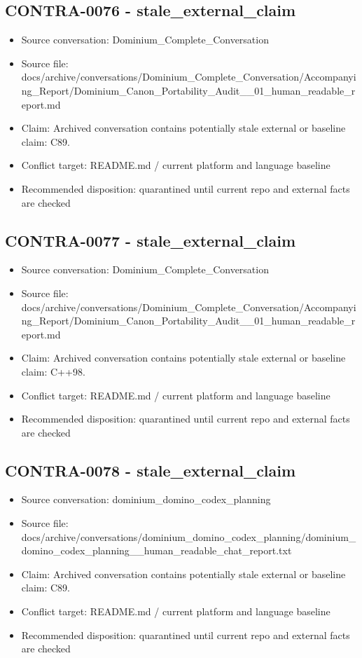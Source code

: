 \documentclass[11pt,a4paper]{report}
\begin{document}
\subsection{CONTRA-0076 - stale\_external\_claim}

\begin{itemize}
\item Source conversation: Dominium\_Complete\_Conversation
\item Source file: docs/archive/conversations/Dominium\_Complete\_Conversation/Accompanying\_Report/Dominium\_Canon\_Portability\_Audit\_\_01\_human\_readable\_report.md
\item Claim: Archived conversation contains potentially stale external or baseline claim: C89.
\item Conflict target: README.md / current platform and language baseline
\item Recommended disposition: quarantined until current repo and external facts are checked
\end{itemize}

\subsection{CONTRA-0077 - stale\_external\_claim}

\begin{itemize}
\item Source conversation: Dominium\_Complete\_Conversation
\item Source file: docs/archive/conversations/Dominium\_Complete\_Conversation/Accompanying\_Report/Dominium\_Canon\_Portability\_Audit\_\_01\_human\_readable\_report.md
\item Claim: Archived conversation contains potentially stale external or baseline claim: C++98.
\item Conflict target: README.md / current platform and language baseline
\item Recommended disposition: quarantined until current repo and external facts are checked
\end{itemize}

\subsection{CONTRA-0078 - stale\_external\_claim}

\begin{itemize}
\item Source conversation: dominium\_domino\_codex\_planning
\item Source file: docs/archive/conversations/dominium\_domino\_codex\_planning/dominium\_domino\_codex\_planning\_\_human\_readable\_chat\_report.txt
\item Claim: Archived conversation contains potentially stale external or baseline claim: C89.
\item Conflict target: README.md / current platform and language baseline
\item Recommended disposition: quarantined until current repo and external facts are checked
\end{itemize}
\end{document}
